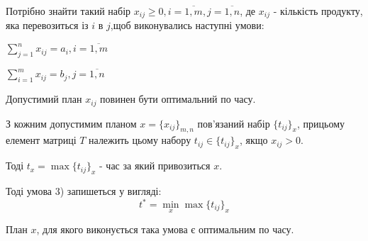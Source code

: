 \documentclass[12pt,a4paper]{book}
\newenvironment{slim_enumerate}{
\begin{enumerate}
  \setlength{\itemsep}{1pt}
  \setlength{\parskip}{0pt}
  \setlength{\parsep}{0pt}}
{\end{enumerate}}
\begin{document}
Потрібно знайти такий набір $x_{ij} \geq 0, i = \overline{1,m}, j = \overline{1,n}$, де $x_{ij}$ - кількість продукту, яка перевозиться із $i$ в $j$,щоб виконувались наступні умови:
\begin{slim_enumerate}
  \item $ \sum_{j=1}^n x_{ij} = a_i, i = \overline{1,m} $
  \item $ \sum_{i=1}^m x_{ij} = b_j, j = \overline{1,n} $
  \item Допустимий план $x_{ij}$ повинен бути оптимальний по часу.
\end{slim_enumerate}

З кожним допустимим планом $x=\{x_{ij}\}_{m,n}$ пов’язаний набір $\{t_{ij}\}_x$, прицьому елемент матриці $T$ належить цьому набору $t_{ij} \in \{t_{ij}\}_x$, якщо $x_{ij}>0$.

Тоді $t_x = \max \{t_{ij}\}_x$ - час за який привозиться $x$.

Тоді умова 3) запишеться у вигляді:
\[ t^*=\displaystyle\min_x \max \{t_{ij}\}_x \]

План $x$, для якого виконується така умова є оптимальним по часу.
\end{document}
